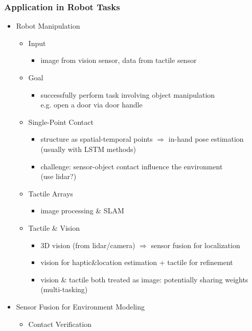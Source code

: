 \subsubsection{Application in Robot Tasks}
\begin{itemize}
\item Robot Manipulation
	\begin{itemize}
	\item Input
		\begin{itemize}
		\item image from vision sensor, data from tactile sensor
		\end{itemize}
	\item Goal
		\begin{itemize}
		\item successfully perform task involving object manipulation \\
		e.g. open a door via door handle
		\end{itemize}
	\item Single-Point Contact
		\begin{itemize}
		\item structure as spatial-temporal points
		$\Rightarrow$ in-hand pose estimation (usually with LSTM methods)
		\item challenge: sensor-object contact influence the environment \\
		(use lidar?)
		\end{itemize}
	\item Tactile Arrays
		\begin{itemize}
		\item image processing \& SLAM
		\end{itemize}
	\item Tactile \& Vision
		\begin{itemize}
		\item 3D vision (from lidar/camera) $\Rightarrow$ sensor fusion for localization
		\item vision for haptic\&location estimation + tactile for refinement
		\item vision \& tactile both treated as image: potentially sharing weights (multi-tasking)
		\end{itemize}
	\end{itemize}
\item Sensor Fusion for Environment Modeling
	\begin{itemize}
	\item Contact Verification
		\begin{itemize}

\end{itemize}
\end{itemize}
\end{itemize}
